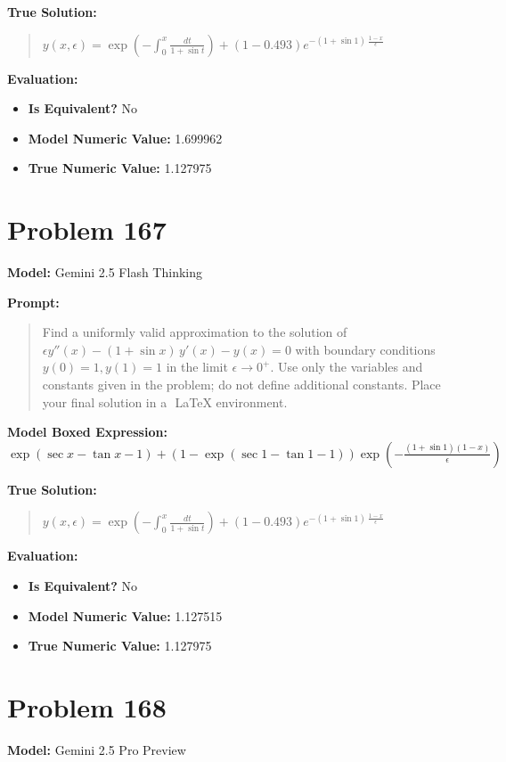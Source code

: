 \documentclass{article}
\begin{document}
{\textbf{True Solution:}
\begin{quote}
$y(x,\epsilon)=\exp\left( -\int_0^x \frac{dt}{1 + \sin t} \right)+\left(1 - 0.493\right) e^{-(1 + \sin 1)\, \frac{1 - x}{\epsilon}}$
\end{quote}

\textbf{Evaluation:}
\begin{itemize}
\item \textbf{Is Equivalent?} No
\item \textbf{Model Numeric Value:} 1.699962
\item \textbf{True Numeric Value:} 1.127975
\end{itemize}
\vspace{1cm}
\section*{Problem 167}
\textbf{Model:} Gemini 2.5 Flash Thinking

\textbf{Prompt:}
\begin{quote}
Find a uniformly valid approximation to the solution of $\epsilon y''(x) - (1 + \sin x)\, y'(x) - y(x) = 0$ with boundary conditions $y(0) = 1, y(1) = 1$ in the limit $\epsilon \to 0^+$. Use only the variables and constants given in the problem; do not define additional constants. Place your final solution in a $\boxed{}$ LaTeX environment.
\end{quote}
\textbf{Model Boxed Expression:} $\exp(\sec x - \tan x - 1) + (1 - \exp(\sec 1 - \tan 1 - 1)) \exp\left(-\frac{(1+\sin 1)(1-x)}{\epsilon}\right)$

\textbf{True Solution:}
\begin{quote}
$y(x,\epsilon)=\exp\left( -\int_0^x \frac{dt}{1 + \sin t} \right)+\left(1 - 0.493\right) e^{-(1 + \sin 1)\, \frac{1 - x}{\epsilon}}$
\end{quote}

\textbf{Evaluation:}
\begin{itemize}
\item \textbf{Is Equivalent?} No
\item \textbf{Model Numeric Value:} 1.127515
\item \textbf{True Numeric Value:} 1.127975
\end{itemize}
\vspace{1cm}
\section*{Problem 168}
\textbf{Model:} Gemini 2.5 Pro Preview

}
\end{document}
